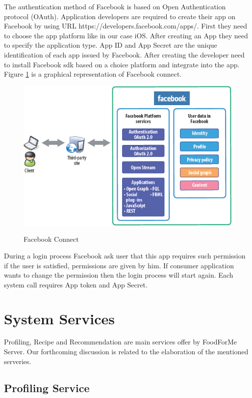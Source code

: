 The authentication method of Facebook is based on Open Authentication protocol (OAuth). Application developers are required to create their app on Facebook by using URL  https://developers.facebook.com/apps/. First they need to choose the app platform like in our case iOS. After creating an App they need to specify the application type.  App ID and App Secret are the unique identification of each app issued by Facebook. After creating the developer need to install Facebook sdk based on a choice platform and integrate into the app. Figure \ref{fig:ch4_facebook_connect} is a graphical representation of Facebook connect.\newline

	\begin{figure}[h]
		\centering
		\includegraphics[width=.68\linewidth]{figures/ch4_facebook_connect.png}
		\caption{Facebook Connect}
		\label{fig:ch4_facebook_connect}
		\cite{ko2010social}
	\end{figure}
	
\newpage
 During a login process Facebook ask user that this app requires such permission if the user is satisfied, permissions are given by him. If consumer application wants to change the permission then the login process will start again. Each system call requires App token and App Secret. 


		
\section{System Services}

Profiling, Recipe and Recommendation are main services offer by FoodForMe Server. Our forthcoming discussion is related to the elaboration of the mentioned serveries. 

\subsection{Profiling Service}

